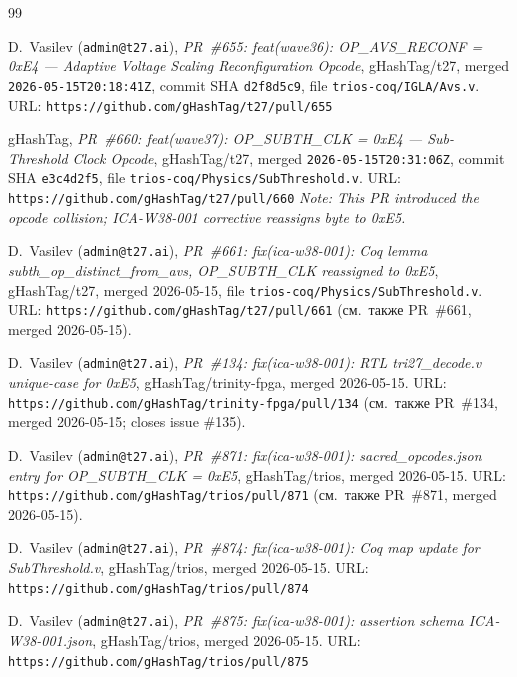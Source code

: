 

\begin{thebibliography}{99}

D.~Vasilev (\texttt{admin@t27.ai}),
\emph{PR~\#655: feat(wave36): OP\_AVS\_RECONF = 0xE4 — Adaptive Voltage Scaling
Reconfiguration Opcode},
gHashTag/t27, merged \texttt{2026-05-15T20:18:41Z},
commit SHA \texttt{d2f8d5c9},
file \texttt{trios-coq/IGLA/Avs.v}.
URL: \texttt{https://github.com/gHashTag/t27/pull/655}

gHashTag,
\emph{PR~\#660: feat(wave37): OP\_SUBTH\_CLK = 0xE4 — Sub-Threshold Clock Opcode},
gHashTag/t27, merged \texttt{2026-05-15T20:31:06Z},
commit SHA \texttt{e3c4d2f5},
file \texttt{trios-coq/Physics/SubThreshold.v}.
URL: \texttt{https://github.com/gHashTag/t27/pull/660}
\textit{Note: This PR introduced the opcode collision; ICA-W38-001 corrective
reassigns byte to 0xE5.}

D.~Vasilev (\texttt{admin@t27.ai}),
\emph{PR~\#661: fix(ica-w38-001): Coq lemma subth\_op\_distinct\_from\_avs,
OP\_SUBTH\_CLK reassigned to 0xE5},
gHashTag/t27, merged 2026-05-15,
file \texttt{trios-coq/Physics/SubThreshold.v}.
URL: \texttt{https://github.com/gHashTag/t27/pull/661}
(см.\ также PR~\#661, merged 2026-05-15).

D.~Vasilev (\texttt{admin@t27.ai}),
\emph{PR~\#134: fix(ica-w38-001): RTL tri27\_decode.v unique-case for 0xE5},
gHashTag/trinity-fpga, merged 2026-05-15.
URL: \texttt{https://github.com/gHashTag/trinity-fpga/pull/134}
(см.\ также PR~\#134, merged 2026-05-15; closes issue \#135).

D.~Vasilev (\texttt{admin@t27.ai}),
\emph{PR~\#871: fix(ica-w38-001): sacred\_opcodes.json entry for OP\_SUBTH\_CLK = 0xE5},
gHashTag/trios, merged 2026-05-15.
URL: \texttt{https://github.com/gHashTag/trios/pull/871}
(см.\ также PR~\#871, merged 2026-05-15).

D.~Vasilev (\texttt{admin@t27.ai}),
\emph{PR~\#874: fix(ica-w38-001): Coq map update for SubThreshold.v},
gHashTag/trios, merged 2026-05-15.
URL: \texttt{https://github.com/gHashTag/trios/pull/874}

D.~Vasilev (\texttt{admin@t27.ai}),
\emph{PR~\#875: fix(ica-w38-001): assertion schema ICA-W38-001.json},
gHashTag/trios, merged 2026-05-15.
URL: \texttt{https://github.com/gHashTag/trios/pull/875}


\end{thebibliography}
